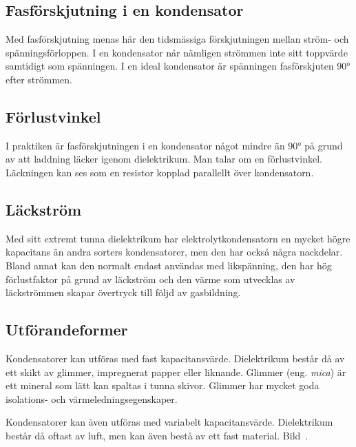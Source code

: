 \subsection{Fasförskjutning i en kondensator}

Med fasförskjutning menas här den tidsmässiga förskjutningen mellan ström- och
spänningsförloppen.
I en kondensator når nämligen strömmen inte sitt toppvärde samtidigt som
spänningen.
I en ideal kondensator är spänningen fasförskjuten \ang{90} efter strömmen.

\subsection{Förlustvinkel}

I praktiken är fasförskjutningen i en kondensator något mindre än \ang{90} på
grund av att laddning läcker igenom dielektrikum.
Man talar om en förlustvinkel.
Läckningen kan ses som en resistor kopplad parallellt över kondensatorn.

\subsection{Läckström}

Med sitt extremt tunna dielektrikum har elektrolytkondensatorn en mycket högre
kapacitans än andra sorters kondensatorer, men den har också några nackdelar.
Bland annat kan den normalt endast användas med likspänning, den har hög 
förlustfaktor på grund av läckström och den värme som utvecklas av läckströmmen 
skapar övertryck till följd av gasbildning.

\subsection{Utförandeformer}

Kondensatorer kan utföras med fast kapacitansvärde.
Dielektrikum består då av ett skikt av glimmer, impregnerat papper eller
liknande.
Glimmer (eng. \emph{mica}) är ett mineral som lätt kan spaltas i tunna skivor.
Glimmer har mycket goda isolations- och värmeledningsegenskaper.

Kondensatorer kan även utföras med variabelt kapacitansvärde.
Dielektrikum består då oftast av luft, men kan även bestå av ett fast material.
Bild~.

